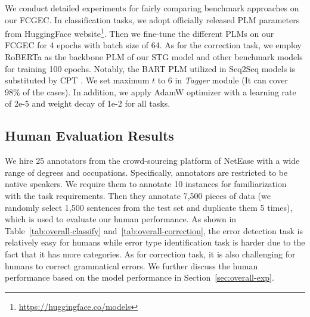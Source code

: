 \documentclass[11pt]{article}
\begin{document}
We conduct detailed experiments for fairly comparing benchmark approaches on our FCGEC. In classification tasks, we adopt officially released PLM parameters from HuggingFace website\footnote{\url{https://huggingface.co/models}}. Then we fine-tune the different PLMs on our FCGEC for 4 epochs with batch size of 64. As for the correction task, we employ RoBERTa as the backbone PLM of our STG model and other benchmark models for training 100 epochs. Notably, the BART PLM \cite{lewis2019bart} utilized in Seq2Seq models is substituted by CPT \cite{shao2021cpt}. We set maximum $t$ to 6 in \emph{Tagger} module (It can cover 98\% of the cases). In addition, we apply AdamW \cite{kingma2014adam} optimizer with a learning rate of 2e-5 and weight decay of 1e-2 for all tasks.

\subsection{Human Evaluation Results}

We hire 25 annotators from the crowd-sourcing platform of NetEase with a wide range of degrees and occupations. Specifically, annotators are restricted to be native speakers. We require them to annotate 10 instances for familiarization with the task requirements. Then they annotate 7,500 pieces of data (we randomly select 1,500 sentences from the test set and duplicate them 5 times), which is used to evaluate our human performance. As shown in Table~\ref{tab:overall-classify} and~\ref{tab:overall-correction}, the error detection task is relatively easy for humans while error type identification task is harder due to the fact that it has more categories. As for correction task, it is also challenging for humans to correct grammatical errors. We further discuss the human performance based on the model performance in Section~\ref{sec:overall-exp}.
\end{document}
